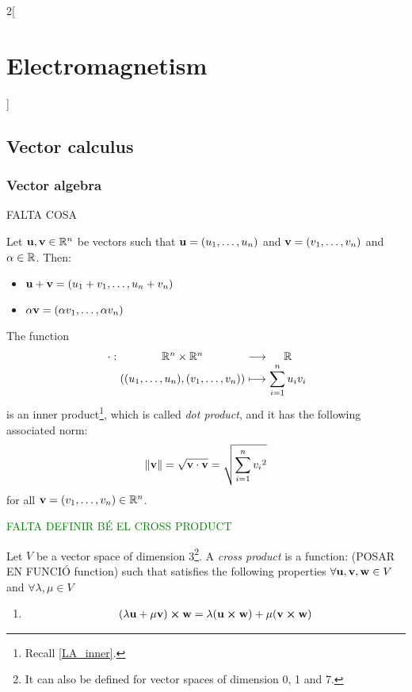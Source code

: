 \documentclass[../../../main.tex]{subfiles}
\begin{document}
\begin{multicols}{2}[\section{Electromagnetism}]
  \subsection{Vector calculus}
  \subsubsection{Vector algebra}
  FALTA COSA
  \begin{prop}
    Let $\boldsymbol{\mathrm{u}},\boldsymbol{\mathrm{v}}\in\mathbb{R}^n$ be vectors such that $\boldsymbol{\mathrm{u}}=(u_1,\ldots,u_n)$ and $\boldsymbol{\mathrm{v}}=(v_1,\ldots,v_n)$ and $\alpha\in\mathbb{R}$. Then:
    \begin{itemize}
      \item $\boldsymbol{\mathrm{u}}+\boldsymbol{\mathrm{v}}=(u_1+v_1,\ldots,u_n+v_n)$
      \item $\alpha\boldsymbol{\mathrm{v}}=(\alpha v_1,\ldots,\alpha v_n)$
    \end{itemize}
  \end{prop}
  \begin{prop}
    The function $$\function{\cdot}{\RR^n\times\RR^n}{\RR}{((u_1,\ldots,u_n),(v_1,\ldots,v_n))}{\displaystyle\sum_{i=1}^nu_iv_i}$$ is an inner product\footnote{Recall \cref{LA_inner}.}, which is called \textit{dot product}, and it has the following associated norm: $$\|\boldsymbol{\mathrm{v}}\|=\sqrt{\boldsymbol{\mathrm{v}}\cdot\boldsymbol{\mathrm{v}}}=\sqrt{\sum_{i=1}^n{v_i}^2}$$ for all $\boldsymbol{\mathrm{v}}=(v_1,\ldots,v_n)\in\mathbb{R}^n$.
  \end{prop}
  \textcolor{green}{FALTA DEFINIR BÉ EL CROSS PRODUCT}
  \begin{definition}
    Let $V$ be a vector space of dimension 3\footnote{It can also be defined for vector spaces of dimension 0, 1 and 7.}. A \textit{cross product} is a function: (POSAR EN FUNCIÓ function)
    such that satisfies the following properties $\forall \boldsymbol{\mathrm{u}},\boldsymbol{\mathrm{v}},\boldsymbol{\mathrm{w}}\in V$ and $\forall \lambda,\mu\in V$
    \begin{enumerate}
      \item \hfill
            \begin{gather*}
              (\lambda\vectorfunction{u}+\mu\vectorfunction{v})\crossprod \vectorfunction{w}=\lambda(\vectorfunction{u}\crossprod\vectorfunction{w})+\mu(\vectorfunction{v}\crossprod\vectorfunction{w})\\

\end{gather*}
\end{enumerate}
\end{definition}
\end{multicols}
\end{document}
